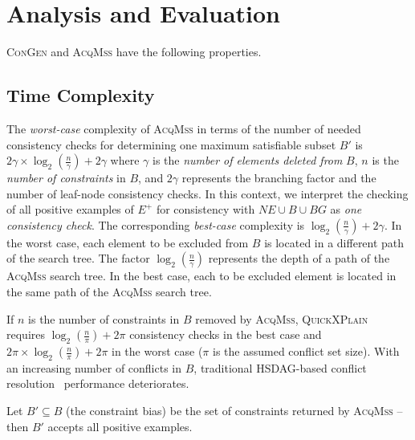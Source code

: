 
\section{Analysis and Evaluation}
\label{sec:evaluation}

\textsc{ConGen} and \textsc{AcqMss} have the following properties.

\subsection{Time Complexity}

The \textit{worst-case} complexity of \textsc{AcqMss} in terms of the number of needed consistency
checks for determining one maximum satisfiable subset $B'$ is $2\gamma \times \log_2(\frac{n}{\gamma}) + 2\gamma$ where
$\gamma$ is the \textit{number of elements deleted from} $B$, $n$ is the \textit{number of constraints} in $B$, and
$2\gamma$ represents the branching factor and the number of leaf-node consistency checks. In
this context, we interpret the checking of all positive examples of $E^+$ for consistency
with $NE \cup B \cup BG$ as \textit{one consistency check}. The corresponding \textit{best-case} complexity
is $\log_2(\frac{n}{\gamma}) + 2\gamma$. In the worst case, each element to be excluded from $B$ is located in a
different path of the search tree. The factor $\log_2(\frac{n}{\gamma})$ represents the depth of a path of
the \textsc{AcqMss} search tree. In the best case, each to be excluded element is located in
the same path of the \textsc{AcqMss} search tree.

If $n$ is the number of constraints in $B$ removed by \textsc{AcqMss}, \textsc{QuickXPlain}~\cite{junker2004}
requires $\log_2(\frac{n}{\pi}) + 2\pi$ consistency checks in the best case and $2\pi \times \log_2(\frac{n}{\pi}) + 2\pi$ in the
worst case ($\pi$ is the assumed conflict set size). With an increasing number of conflicts
in $B$, traditional HSDAG-based conflict resolution~\cite{reiter1987} performance deteriorates.

\begin{theorem}
\label{thm:correctness}
Let $B' \subseteq B$ (the constraint bias) be the set of
constraints returned by \textsc{AcqMss} -- then $B'$ accepts all positive examples.
\end{theorem}

